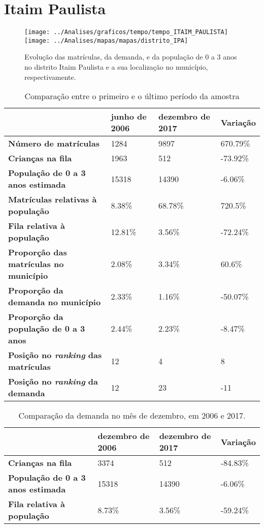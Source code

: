 \section{Itaim Paulista}
\begin{figure}[H]
\centering
\texttt{[image: ../Analises/graficos/tempo/tempo\_ITAIM\_PAULISTA]}
\texttt{[image: ../Analises/mapas/mapas/distrito\_IPA]}
\caption{Evolução das matrículas, da demanda, e da população de 0 a 3 anos no distrito Itaim Paulista e a sua localização no município, respectivamente.}
\end{figure}
\begin{table}[H]
\begin{tabular}{l|l|l|l}
\textbf{}                                      & \textbf{junho de 2006}       & \textbf{dezembro de 2017}    & \textbf{Variação} \\ \hline
\textbf{Número de matrículas}                  & 1284 & 9897 & 670.79\% \\ \hline
\textbf{Crianças na fila}                      & 1963 & 512 & -73.92\% \\ \hline
\textbf{População de 0 a 3 anos estimada}      & 15318 & 14390 & -6.06\% \\ \hline
\textbf{Matrículas relativas à população}      & 8.38\% & 68.78\% & 720.5\% \\ \hline
\textbf{Fila relativa à população}             & 12.81\% & 3.56\% & -72.24\% \\ \hline
\textbf{Proporção das matrículas no município} & 2.08\% & 3.34\% & 60.6\% \\ \hline
\textbf{Proporção da demanda no município}     & 2.33\% & 1.16\% & -50.07\% \\ \hline
\textbf{Proporção da população de 0 a 3 anos}  & 2.44\% & 2.23\% & -8.47\% \\ \hline
\textbf{Posição no \textit{ranking} das matrículas}     & 12 & 4 & 8 \\ \hline
\textbf{Posição no \textit{ranking} da demanda}         & 12 & 23 & -11 \\ 
\end{tabular}
\caption{Comparação entre o primeiro e o último período da amostra}
\end{table}
\begin{table}[H]
\begin{tabular}{l|l|l|l}
\textbf{}                                 & \textbf{dezembro de 2006} & \textbf{dezembro de 2017} & \textbf{Variação} \\ \hline
\textbf{Crianças na fila}                      & 3374 & 512 & -84.83\% \\ \hline
\textbf{População de 0 a 3 anos estimada}      & 15318 & 14390 & -6.06\% \\ \hline
\textbf{Fila relativa à população}             & 8.73\% & 3.56\% & -59.24\% \\
\end{tabular}
\caption{Comparação da demanda no mês de dezembro, em 2006 e 2017.}
\end{table}
